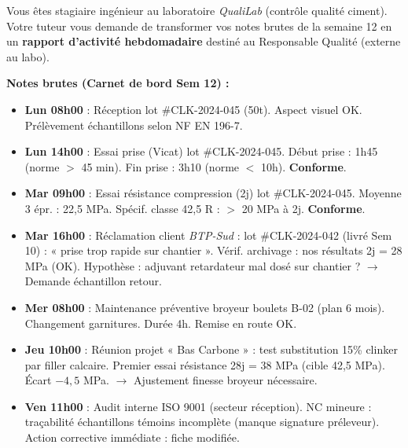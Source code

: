 \documentclass[11pt]{article}
\begin{document}
\begin{exercice}
\label{exo:redaction}
Vous êtes stagiaire ingénieur au laboratoire \textit{QualiLab} (contrôle qualité ciment). Votre tuteur vous demande de transformer vos notes brutes de la semaine 12 en un \textbf{rapport d'activité hebdomadaire} destiné au Responsable Qualité (externe au labo).

\textbf{Notes brutes (Carnet de bord Sem 12) :}
\begin{itemize}
    \item \textbf{Lun 08h00} : Réception lot \#CLK-2024-045 (50t). Aspect visuel OK. Prélèvement échantillons selon NF EN 196-7.
    \item \textbf{Lun 14h00} : Essai prise (Vicat) lot \#CLK-2024-045. Début prise : 1h45 (norme $>$ 45 min). Fin prise : 3h10 (norme $<$ 10h). \textbf{Conforme}.
    \item \textbf{Mar 09h00} : Essai résistance compression (2j) lot \#CLK-2024-045. Moyenne 3 épr. : 22,5 MPa. Spécif. classe 42,5 R : $>$ 20 MPa à 2j. \textbf{Conforme}.
    \item \textbf{Mar 16h00} : Réclamation client \textit{BTP-Sud} : lot \#CLK-2024-042 (livré Sem 10) : « prise trop rapide sur chantier ». Vérif. archivage : nos résultats 2j = 28 MPa (OK). Hypothèse : adjuvant retardateur mal dosé sur chantier ? $\rightarrow$ Demande échantillon retour.
    \item \textbf{Mer 08h00} : Maintenance préventive broyeur boulets B-02 (plan 6 mois). Changement garnitures. Durée 4h. Remise en route OK.
    \item \textbf{Jeu 10h00} : Réunion projet « Bas Carbone » : test substitution 15\% clinker par filler calcaire. Premier essai résistance 28j = 38 MPa (cible 42,5 MPa). Écart $-4,5$ MPa. $\rightarrow$ Ajustement finesse broyeur nécessaire.
    \item \textbf{Ven 11h00} : Audit interne ISO 9001 (secteur réception). NC mineure : traçabilité échantillons témoins incomplète (manque signature préleveur). Action corrective immédiate : fiche modifiée.
\end{itemize}


\end{exercice}
\end{document}

